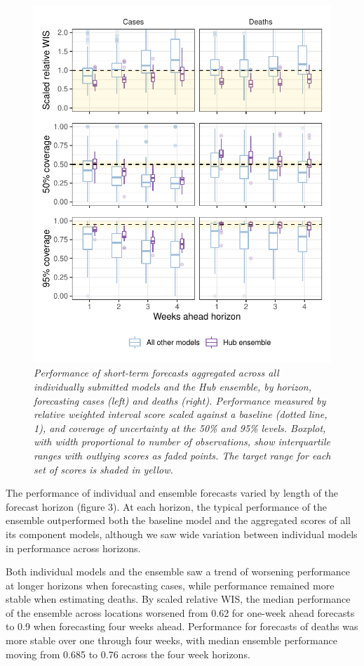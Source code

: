 \documentclass[
]{article}
\begin{document}
\begin{figure}
\centering
\includegraphics{abstract-results_files/figure-latex/figure-2-1.pdf}
\caption{\emph{Performance of short-term forecasts aggregated across all
individually submitted models and the Hub ensemble, by horizon,
forecasting cases (left) and deaths (right). Performance measured by
relative weighted interval score scaled against a baseline (dotted line,
1), and coverage of uncertainty at the 50\% and 95\% levels. Boxplot,
with width proportional to number of observations, show interquartile
ranges with outlying scores as faded points. The target range for each
set of scores is shaded in yellow.}}
\end{figure}

The performance of individual and ensemble forecasts varied by length of
the forecast horizon (figure 3). At each horizon, the typical
performance of the ensemble outperformed both the baseline model and the
aggregated scores of all its component models, although we saw wide
variation between individual models in performance across horizons.

Both individual models and the ensemble saw a trend of worsening
performance at longer horizons when forecasting cases, while performance
remained more stable when estimating deaths. By scaled relative WIS, the
median performance of the ensemble across locations worsened from 0.62
for one-week ahead forecasts to 0.9 when forecasting four weeks ahead.
Performance for forecasts of deaths was more stable over one through
four weeks, with median ensemble performance moving from 0.685 to 0.76
across the four week horizons.
\end{document}

